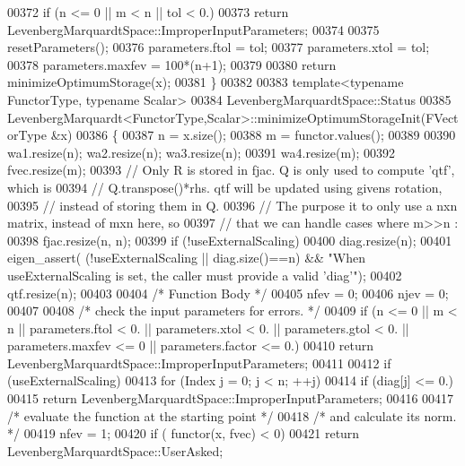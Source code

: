 \begin{DoxyCode}
00372     \textcolor{keywordflow}{if} (n <= 0 || m < n || tol < 0.)
00373         \textcolor{keywordflow}{return} LevenbergMarquardtSpace::ImproperInputParameters;
00374 
00375     resetParameters();
00376     parameters.ftol = tol;
00377     parameters.xtol = tol;
00378     parameters.maxfev = 100*(n+1);
00379 
00380     \textcolor{keywordflow}{return} minimizeOptimumStorage(x);
00381 \}
00382 
00383 \textcolor{keyword}{template}<\textcolor{keyword}{typename} FunctorType, \textcolor{keyword}{typename} Scalar>
00384 LevenbergMarquardtSpace::Status
00385 LevenbergMarquardt<FunctorType,Scalar>::minimizeOptimumStorageInit(FVectorType  &x)
00386 \{
00387     n = x.size();
00388     m = functor.values();
00389 
00390     wa1.resize(n); wa2.resize(n); wa3.resize(n);
00391     wa4.resize(m);
00392     fvec.resize(m);
00393     \textcolor{comment}{// Only R is stored in fjac. Q is only used to compute 'qtf', which is}
00394     \textcolor{comment}{// Q.transpose()*rhs. qtf will be updated using givens rotation,}
00395     \textcolor{comment}{// instead of storing them in Q.}
00396     \textcolor{comment}{// The purpose it to only use a nxn matrix, instead of mxn here, so}
00397     \textcolor{comment}{// that we can handle cases where m>>n :}
00398     fjac.resize(n, n);
00399     \textcolor{keywordflow}{if} (!useExternalScaling)
00400         diag.resize(n);
00401     eigen\_assert( (!useExternalScaling || diag.size()==n) && \textcolor{stringliteral}{"When useExternalScaling is set, the caller
       must provide a valid 'diag'"});
00402     qtf.resize(n);
00403 
00404     \textcolor{comment}{/* Function Body */}
00405     nfev = 0;
00406     njev = 0;
00407 
00408     \textcolor{comment}{/*     check the input parameters for errors. */}
00409     \textcolor{keywordflow}{if} (n <= 0 || m < n || parameters.ftol < 0. || parameters.xtol < 0. || parameters.gtol < 0. || 
      parameters.maxfev <= 0 || parameters.factor <= 0.)
00410         \textcolor{keywordflow}{return} LevenbergMarquardtSpace::ImproperInputParameters;
00411 
00412     \textcolor{keywordflow}{if} (useExternalScaling)
00413         \textcolor{keywordflow}{for} (Index j = 0; j < n; ++j)
00414             \textcolor{keywordflow}{if} (diag[j] <= 0.)
00415                 \textcolor{keywordflow}{return} LevenbergMarquardtSpace::ImproperInputParameters;
00416 
00417     \textcolor{comment}{/*     evaluate the function at the starting point */}
00418     \textcolor{comment}{/*     and calculate its norm. */}
00419     nfev = 1;
00420     \textcolor{keywordflow}{if} ( functor(x, fvec) < 0)
00421         \textcolor{keywordflow}{return} LevenbergMarquardtSpace::UserAsked;

\end{DoxyCode}
